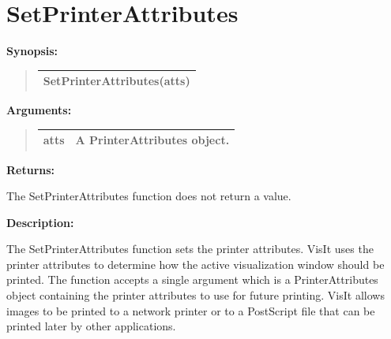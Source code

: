 \documentclass[letterpaper,10pt,english]{sphinxmanual}
\begin{document}
\section{SetPrinterAttributes}
\label{functions:setprinterattributes}
\begin{DUlineblock}{0em}
\item[] \textbf{Synopsis:}
\end{DUlineblock}
\begin{quote}

\begin{tabulary}{\linewidth}{|L|}
\hline

SetPrinterAttributes(atts)
\\
\hline\end{tabulary}

\end{quote}

\begin{DUlineblock}{0em}
\item[] 
\item[] \textbf{Arguments:}
\end{DUlineblock}
\begin{quote}

\begin{tabulary}{\linewidth}{|L|L|}
\hline

atts
 & 
A PrinterAttributes object.
\\
\hline\end{tabulary}

\end{quote}

\begin{DUlineblock}{0em}
\item[] 
\item[] \textbf{Returns:}
\item[] The SetPrinterAttributes function does not return a value.
\item[] 
\item[] \textbf{Description:}
\item[] The SetPrinterAttributes function sets the printer attributes. VisIt uses
the printer attributes to determine how the active visualization window
should be printed. The function accepts a single argument which is a
PrinterAttributes object containing the printer attributes to use for
future printing. VisIt allows images to be printed to a network printer or
to a PostScript file that can be printed later by other applications.
\end{DUlineblock}
\end{document}
